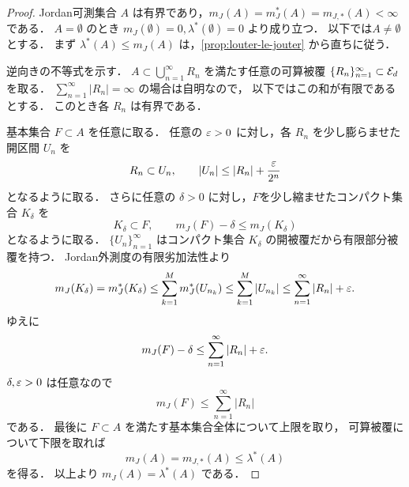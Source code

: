 \begin{proof}
Jordan可測集合 $A$ は有界であり，$m_J(A) = m_J^*(A) = m_{J,*}(A) <\infty$ である．
$A = \emptyset$ のとき $m_J(\emptyset)=0, \lambda^*(\emptyset)=0$ より成り立つ．
以下では$A \neq \emptyset$ とする．
まず $\lambda^*(A)\le m_J(A)$ は，\cref{prop:louter-le-jouter} から直ちに従う．

逆向きの不等式を示す．
$A\subset\bigcup_{n=1}^\infty R_n$ を満たす任意の可算被覆
$\{R_n\}_{n=1}^\infty\subset\mathcal E_d$ を取る．
$\sum_{n=1}^\infty |R_n|=\infty$ の場合は自明なので，
以下ではこの和が有限であるとする．
このとき各 $R_n$ は有界である．

基本集合 $F\subset A$ を任意に取る．
任意の $\varepsilon>0$ に対し，各 $R_n$ を少し膨らませた開区間 $U_n$ を
\[
R_n\subset U_n,
\qquad
|U_n|\le |R_n|+\frac{\varepsilon}{2^n}
\]
となるように取る．
%
さらに任意の $\delta >0$ に対し，$F$を少し縮ませたコンパクト集合 $K_\delta$ を
\[
K_\delta \subset F, \qquad m_J(F) - \delta \le m_J(K_\delta)
\]
となるように取る．
%
$\{U_n\}_{n=1}^\infty$ はコンパクト集合 $K_\delta$ の開被覆だから有限部分被覆を持つ．
Jordan外測度の有限劣加法性より
\[
m_J(K_\delta)=m_J^*(K_\delta)
\le
\sum_{k=1}^M m_J^*(U_{n_k})
\le
\sum_{k=1}^M |U_{n_k}|
\le
\sum_{n=1}^\infty |R_n|+\varepsilon .
\]
ゆえに
\[
m_J(F)-\delta
\le
\sum_{n=1}^\infty |R_n|+\varepsilon .
\]
$\delta,\varepsilon>0$ は任意なので
\[
m_J(F)\le \sum_{n=1}^\infty |R_n|
\]
である．
最後に $F\subset A$ を満たす基本集合全体について上限を取り，
可算被覆について下限を取れば \[m_J(A)=m_{J,*}(A)\le\lambda^*(A)\] を得る．
以上より $m_J(A)=\lambda^*(A)$ である．
\end{proof}

